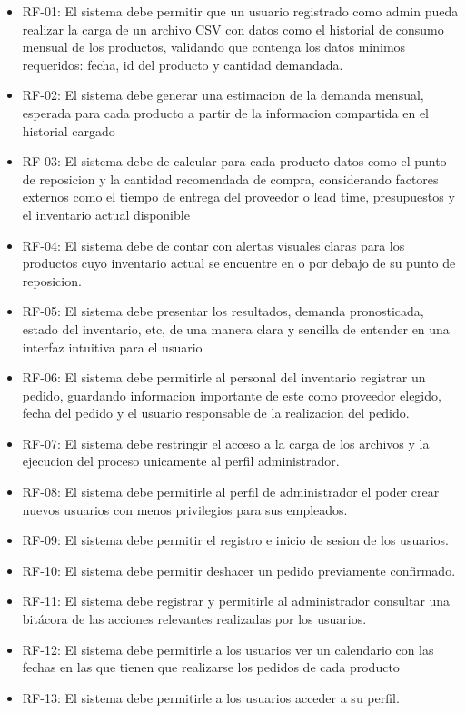 \begin{itemize}
    \item RF-01: El sistema debe permitir que un usuario registrado como admin pueda realizar la carga de un archivo CSV con datos como el historial de consumo mensual de los productos, validando que contenga los datos minimos requeridos: fecha, id del producto y cantidad demandada.
    \item RF-02: El sistema debe generar una estimacion de la demanda mensual, esperada para cada producto a partir de la informacion compartida en el historial cargado
    \item RF-03: El sistema debe de calcular para cada producto datos como el punto de reposicion y la cantidad recomendada de compra, considerando factores externos como el tiempo de entrega del proveedor o lead time, presupuestos y el inventario actual disponible
    \item RF-04: El sistema debe de contar con alertas visuales claras para los productos cuyo inventario actual se encuentre en o por debajo de su punto de reposicion.
    \item RF-05: El sistema debe presentar los resultados, demanda pronosticada, estado del inventario, etc, de una manera clara y sencilla de entender en una interfaz intuitiva para el usuario
    \item RF-06: El sistema debe permitirle al personal del inventario registrar un pedido, guardando informacion importante de este como proveedor elegido, fecha del pedido y el usuario responsable de la realizacion del pedido.
    \item RF-07: El sistema debe restringir el acceso a la carga de los archivos y la ejecucion del proceso unicamente al perfil administrador.
    \item RF-08: El sistema debe permitirle al perfil de administrador el poder crear nuevos usuarios con menos privilegios para sus empleados.
    \item RF-09: El sistema debe permitir el registro e inicio de sesion de los usuarios.
    \item RF-10: El sistema debe permitir deshacer un pedido previamente confirmado.
    \item RF-11: El sistema debe registrar y permitirle al administrador consultar una bitácora de las acciones relevantes realizadas por los usuarios.
    \item RF-12: El sistema debe permitirle a los usuarios ver un calendario con las fechas en las que tienen que realizarse los pedidos de cada producto
    \item RF-13: El sistema debe permitirle a los usuarios acceder a su perfil.
\end{itemize}

